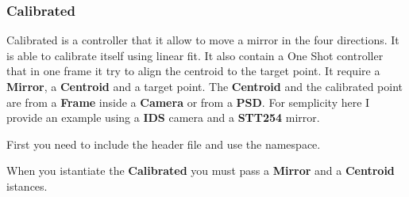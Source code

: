 \hypertarget{calibrated}{%
\subsubsection{Calibrated}\label{calibrated}}

Calibrated is a controller that it allow to move a mirror in the four
directions. It is able to calibrate itself using linear fit. It also
contain a One Shot controller that in one frame it try to align the
centroid to the target point. It require a \textbf{Mirror}, a
\textbf{Centroid} and a target point. The \textbf{Centroid} and the
calibrated point are from a \textbf{Frame} inside a \textbf{Camera} or
from a \textbf{PSD}. For semplicity here I provide an example using a
\textbf{IDS} camera and a \textbf{STT254} mirror.

First you need to include the header file and use the namespace.

\begin{Shaded}
\begin{Highlighting}[]
 
 
 
\end{Highlighting}
\end{Shaded}

When you istantiate the \textbf{Calibrated} you must pass a
\textbf{Mirror} and a \textbf{Centroid} istances.

\begin{Shaded}
\begin{Highlighting}[]
\end{Highlighting}
\end{Shaded}

